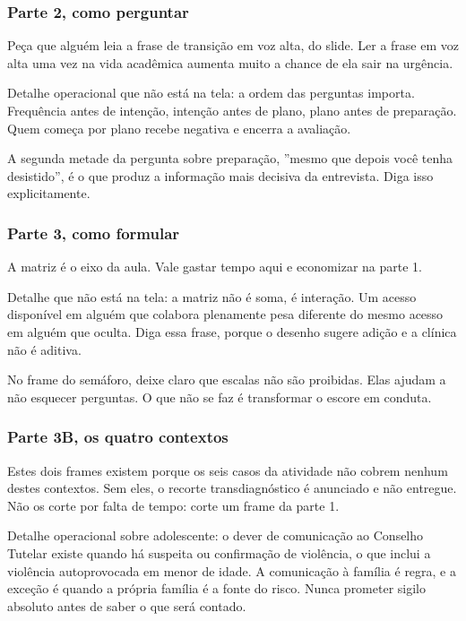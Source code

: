 \subsubsection*{Parte 2, como perguntar}

Peça que alguém leia a frase de transição em voz alta, do slide. Ler a frase em voz alta uma vez na vida acadêmica aumenta muito a chance de ela sair na urgência.

Detalhe operacional que não está na tela: a ordem das perguntas importa. Frequência antes de intenção, intenção antes de plano, plano antes de preparação. Quem começa por plano recebe negativa e encerra a avaliação.

A segunda metade da pergunta sobre preparação, ''mesmo que depois você tenha desistido'', é o que produz a informação mais decisiva da entrevista. Diga isso explicitamente.

\subsubsection*{Parte 3, como formular}

A matriz é o eixo da aula. Vale gastar tempo aqui e economizar na parte 1.

Detalhe que não está na tela: a matriz não é soma, é interação. Um acesso disponível em alguém que colabora plenamente pesa diferente do mesmo acesso em alguém que oculta. Diga essa frase, porque o desenho sugere adição e a clínica não é aditiva.

No frame do semáforo, deixe claro que escalas não são proibidas. Elas ajudam a não esquecer perguntas. O que não se faz é transformar o escore em conduta.

\subsubsection*{Parte 3B, os quatro contextos}

Estes dois frames existem porque os seis casos da atividade não cobrem nenhum destes contextos. Sem eles, o recorte transdiagnóstico é anunciado e não entregue. Não os corte por falta de tempo: corte um frame da parte 1.

Detalhe operacional sobre adolescente: o dever de comunicação ao Conselho Tutelar existe quando há suspeita ou confirmação de violência, o que inclui a violência autoprovocada em menor de idade. A comunicação à família é regra, e a exceção é quando a própria família é a fonte do risco. Nunca prometer sigilo absoluto antes de saber o que será contado.

